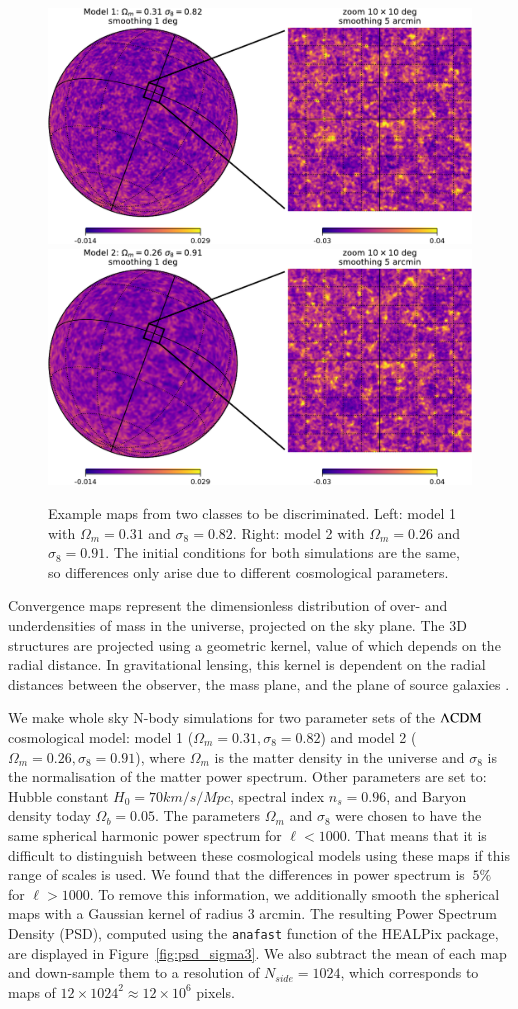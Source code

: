\documentclass[final,twocolumn,3p,times,sort&compress]{elsarticle}
\newcommand{\figref}[1]{Figure~\ref{fig:#1}}
\newcommand{\1}{\b{1}}              %
\newcommand{\0}{\b{0}}              %
\begin{document}
\begin{figure}
	\centering
	\includegraphics[width=0.48\linewidth]{figure_kappa_diff_model1}
	\hfill
	\includegraphics[width=0.48\linewidth]{figure_kappa_diff_model2}
	\caption{Example maps from two classes to be discriminated. Left: model 1 with $\Omega_m=0.31$ and $\sigma_8=0.82$. Right: model 2 with $\Omega_m=0.26$ and $\sigma_8=0.91$.
	The initial conditions for both simulations are the same, so differences only arise due to different cosmological parameters.}
	\label{fig:map_sample}
\end{figure}

Convergence maps represent the dimensionless distribution of over- and underdensities of mass in the universe, projected on the sky plane.
The 3D structures are projected using a geometric kernel, value of which depends on the radial distance.
In gravitational lensing, this kernel is dependent on the radial distances between the observer, the mass plane, and the plane of source galaxies \citep[see][for a review of gravitational lensing]{bartelman2010gravitationallensing}.

We make whole sky N-body simulations for two parameter sets of the $\Lambda\rm{CDM}$ cosmological model: model 1 ($\Omega_m=0.31, \sigma_8=0.82$) and model 2 ($\Omega_m=0.26, \sigma_8=0.91$), where $\Omega_m$ is the matter density in the universe and $\sigma_8$ is the normalisation of the matter power spectrum.
Other parameters are set to: Hubble constant $H_0=70 km/s/Mpc$, spectral index $n_s=0.96$, and Baryon density today $\Omega_b=0.05$.
The parameters $\Omega_m$ and $\sigma_8$ were chosen to have the same spherical harmonic power spectrum for $\ell<1000$.
That means that it is difficult to distinguish between these cosmological models using these maps if this range of scales is used.
We found that the differences in power spectrum is $~5\%$ for $\ell>1000$.
To remove this information, we additionally smooth the spherical maps with a Gaussian kernel of radius $3$ arcmin.
The resulting Power Spectrum Density (PSD), computed using the \texttt{anafast} function of the HEALPix package, are displayed in \figref{psd_sigma3}.
We also subtract the mean of each map and down-sample them to a resolution of $N_{side}=1024$, which corresponds to maps of $12 \times 1024^2 \approx 12 \times 10^6$ pixels.
\end{document}
